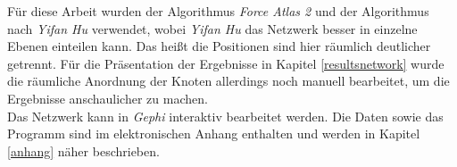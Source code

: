 Für diese Arbeit wurden der Algorithmus \textit{Force Atlas 2} \cite{forceatlas2} und der Algorithmus nach \textit{Yifan Hu} \cite{yifanhu} verwendet, wobei \textit{Yifan Hu} das Netzwerk besser in einzelne Ebenen einteilen kann. Das heißt die Positionen sind hier räumlich deutlicher getrennt. Für die Präsentation der Ergebnisse in Kapitel \ref{resultsnetwork} wurde die räumliche Anordnung der Knoten allerdings noch manuell bearbeitet, um die Ergebnisse anschaulicher zu machen.\\
Das Netzwerk kann in \textit{Gephi} interaktiv bearbeitet werden. Die Daten sowie das Programm sind im elektronischen Anhang enthalten und werden in Kapitel \ref{anhang} näher beschrieben.



